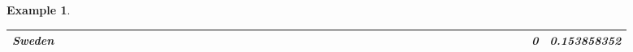 \documentclass[a4paper,11pt]{report}
\newtheorem{example}[theorem]{Example}
\begin{document}
\begin{example}
\begin{appendices}
\begin{landscape}
\begin{longtable}{r|r|r|r|r|r|r|r|r|r|r|r|r|r|r|r|r|r|r|r|r|r|r|r|r|r|r|r|r|r|r|r|r|r|r|r|r|r|r|r|r|r|r|r|}
\multicolumn{1}{|r|}{\textbf{Sweden}}                &                                       &                                       &                                          &                                       &                                       &                                                     &                                        &                                       &                                      &                                       &                                       &                                                &                                       &                                      &                                       &                                       &                                      &                                       &                                       &                                      &                                      &                                         &                                     &                                       &                                      &                                      &                                        &                                       &                                      &                                      &                                        &                                        &                                     &                                      &                                           &                                               &                                      &                                       &                                              &                                      &                                     & 0                                             & 0.153858352                             \\ \hline

\end{longtable}
\end{landscape}
\end{appendices}
\end{example}
\end{document}
